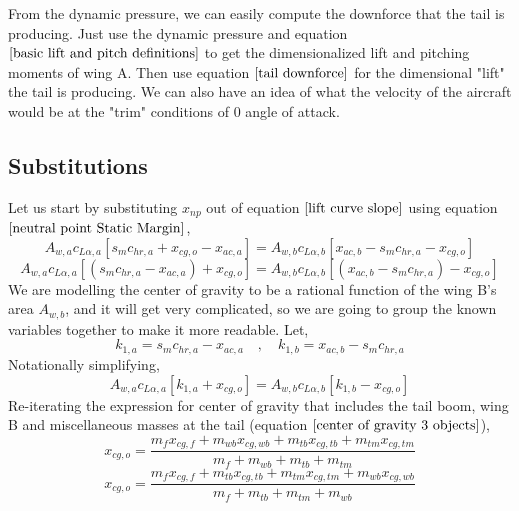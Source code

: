 From the dynamic pressure, we can easily compute the downforce that the tail is producing. Just use the dynamic pressure and equation $\ref{basic lift and pitch definitions}$ to get the dimensionalized lift and pitching moments of wing A. Then use equation $\ref{tail downforce}$ for the dimensional "lift" the tail is producing. We can also have an idea of what the velocity of the aircraft would be at the "trim" conditions of $0$ angle of attack.

\subsection{Substitutions}
\begin{comment}
\end{comment}
Let us start by substituting $x_{np}$ out of equation $\ref{lift curve slope}$ using equation $\ref{neutral point Static Margin}$,
$$A_{w,a} c_{L\alpha,a} \left[s_{m}c_{hr,a} + x_{cg,o} - x_{ac,a}\right] = A_{w,b} c_{L\alpha,b}\left[x_{ac,b} -s_{m}c_{hr,a} - x_{cg,o}\right] $$
$$A_{w,a} c_{L\alpha,a} \left[(s_{m}c_{hr,a} - x_{ac,a}) + x_{cg,o}\right] = A_{w,b} c_{L\alpha,b}\left[(x_{ac,b} -s_{m}c_{hr,a}) - x_{cg,o}\right] $$
We are modelling the center of gravity to be a rational function of the wing B's area $A_{w,b}$, and it will get very complicated, so we are going to group the known variables together to make it more readable. Let,
\begin{equation}k_{1,a} = s_{m}c_{hr,a} - x_{ac,a} \quad,\quad k_{1,b} = x_{ac,b} -s_{m}c_{hr,a} \label{k1 definitions}\end{equation}
Notationally simplifying,
\begin{equation}A_{w,a} c_{L\alpha,a} \left[k_{1,a} + x_{cg,o}\right] = A_{w,b} c_{L\alpha,b}\left[k_{1,b} - x_{cg,o}\right] \label{Area of Tail Part 1}\end{equation}
Re-iterating the expression for center of gravity that includes the tail boom, wing B and miscellaneous masses at the tail (equation $\ref{center of gravity 3 objects}$),
$$x_{cg,o} = \frac{m_{f}x_{cg,f} + m_{wb}x_{cg,wb} + m_{tb}x_{cg,tb} + m_{tm}x_{cg,tm}}{m_{f} + m_{wb} + m_{tb} + m_{tm}} $$
$$x_{cg,o} = \frac{m_{f}x_{cg,f} + m_{tb}x_{cg,tb} + m_{tm}x_{cg,tm} + m_{wb}x_{cg,wb}}{m_{f} + m_{tb} + m_{tm} + m_{wb}}$$
